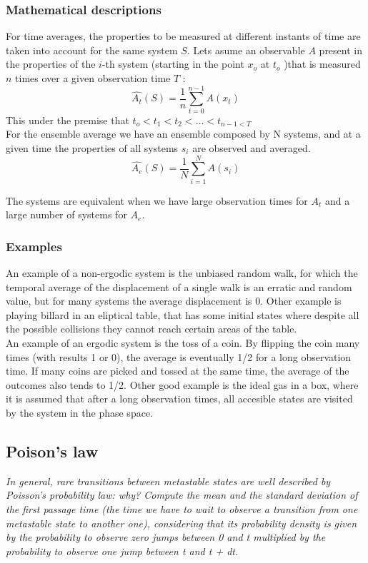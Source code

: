 \documentclass{article}
\begin{document}
\subsubsection*{Mathematical descriptions}
For time averages, the properties to be measured at different instants of time are taken into account for the same system $S$. Lets asume an observable $A$ present in the properties of the $i$-th system (starting in the point $x_o$ at $t_o$ )that is measured $n$ times over a given observation time $T$ :
\begin{equation}
    \hat{A_t}(S)  = \frac{1}{n}\sum_{t = 0}^{n-1} A(x_t)  
\end{equation}
This under the premise that $t_o < t_1 < t_2 < \ldots < t_{n-1 < T}$\\
For the ensemble average we have an ensemble composed by N systems, and at a given time the properties of all systems $s_i$ are observed and averaged.
\begin{equation}
     \hat{A_e}(S)  = \frac{1}{N}\sum_{i = 1}^{N} A(s_i) 
\end{equation}

The systems are equivalent when we have large observation times for $A_t$ and a large number of systems for $A_e$.
\subsubsection*{Examples}
An example of a non-ergodic system is the unbiased random walk, for which the temporal average of the displacement of a single walk is an erratic and random value, but for many systems the average displacement is 0. Other example is playing billard in an eliptical table, that has some initial states where despite all the possible collisions they cannot reach certain areas of the table. \\
An example of an ergodic system is the toss of a coin. By flipping the coin many times (with results 1 or 0), the average is eventually 1/2 for a long observation time. If many coins are picked and tossed at the same time, the average of the outcomes also tends to 1/2. Other good example is the ideal gas in a box, where it is assumed that after a long observation times, all accesible states are visited by the system in the phase space.
\subsection{Poison's law}
\textit{In general, rare transitions between metastable states are well described by Poisson's probability law: why? Compute the mean and the standard deviation of the first passage time (the time we have to wait to observe a transition from one metastable state to another one), considering that its probability density is given by the probability to observe zero jumps between 0 and t multiplied by the probability to observe one jump between t and t + dt.}
\end{document}
